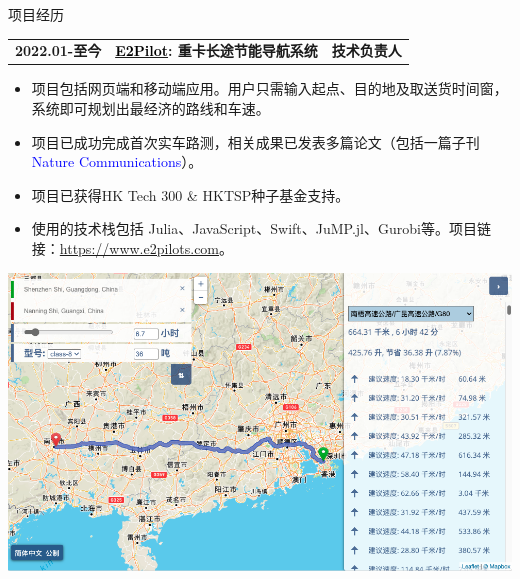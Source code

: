 \documentclass{resume} %
\makeatletter
\newcommand{\trianglebullet}{$\mbox{\ensuremath{\rhd}}$}
\newcommand{\projectheader}[3]{%
  \begin{tabular*}{\linewidth}{@{}l@{\extracolsep{\fill}}l@{\extracolsep{\fill}}r@{}}
    \textbf{#1} & \textbf{#2} & \textbf{#3} \\
  \end{tabular*}%
  \vspace{-0.5em} %
}
\makeatother
\begin{document}

\def\FormatName#1{%
    \def\myname{Junyan Su}%
    \edef\name{#1}%
    \ifx\name\myname
      \underline{#1}%
    \else
       #1%
    \fi
}

\begin{rSection}{项目经历}
    \projectheader{2022.01-至今}{\href{https://www.e2pilots.com/}{\textcolor{black}{E2Pilot}}: 重卡长途节能导航系统}{技术负责人}

    \begin{minipage}[h]{0.65\textwidth} %
         \begin{itemize}
            \item 项目包括网页端和移动端应用。用户只需输入起点、目的地及取送货时间窗，系统即可规划出最经济的路线和车速。%
            \item 项目已成功完成首次实车路测，相关成果已发表多篇论文（包括一篇子刊 \textcolor{blue}{Nature Communications}）。
            \item 项目已获得HK Tech 300 \& HKTSP种子基金支持。
            \item 使用的技术栈包括 Julia、JavaScript、Swift、JuMP.jl、Gurobi等。项目链接：\href{https://www.e2pilots.com/}{https://www.e2pilots.com}。
        \end{itemize}
    \end{minipage}%
    \hfill %
    \begin{minipage}[h]{0.35\textwidth} %
        \centering
        \includegraphics[width=.80\textwidth]{e2pilot-web.png} %
    \end{minipage}



\end{rSection}
\end{document}
